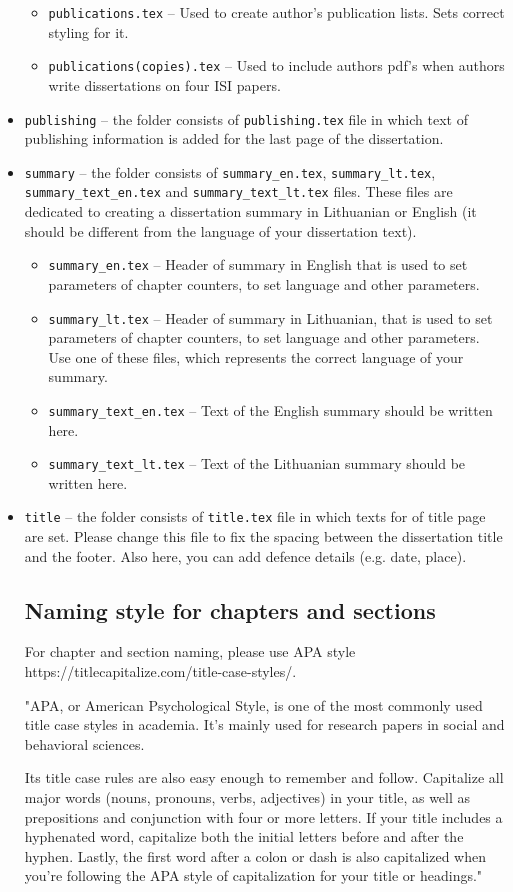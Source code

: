 \begin{itemize}
\begin{itemize}
            \item \verb|publications.tex| -- Used to create author's publication lists. Sets correct styling for it.
            \item \verb|publications(copies).tex| -- Used to include authors pdf's when authors write dissertations on four ISI papers.
        \end{itemize}
    \item \verb|publishing| -- the folder consists of \verb|publishing.tex| file in which text of publishing information is added for the last page of the dissertation.
    \item \verb|summary| -- the folder consists of \verb|summary_en.tex|, \verb|summary_lt.tex|, \verb|summary_text_en.tex| and \verb|summary_text_lt.tex| files. These files are dedicated to creating a dissertation summary in Lithuanian or English (it should be different from the language of your dissertation text).
        \begin{itemize}
            \item \verb|summary_en.tex| -- Header of summary in English that is used to set parameters of chapter counters, to set language and other parameters.
            \item \verb|summary_lt.tex| -- Header of summary in Lithuanian, that is used to set parameters of chapter counters, to set language and other parameters. Use one of these files, which represents the correct language of your summary.
            \item \verb|summary_text_en.tex| -- Text of the English summary should be written here.
            \item \verb|summary_text_lt.tex| -- Text of the Lithuanian summary should be written here.
        \end{itemize}    
    \item \verb|title| -- the folder consists of \verb|title.tex| file in which texts for of title page are set. Please change this file to fix the spacing between the dissertation title and the footer. Also here, you can add defence details (e.g. date, place).
    
\subsection{Naming style for chapters and sections}
For chapter and section naming, please use APA style https://titlecapitalize.com/title-case-styles/.

    "APA, or American Psychological Style, is one of the most commonly used title case styles in academia. It’s mainly used for research papers in social and behavioral sciences. 
        
    Its title case rules are also easy enough to remember and follow. Capitalize all major words (nouns, pronouns, verbs, adjectives) in your title, as well as prepositions and conjunction with four or more letters. If your title includes a hyphenated word, capitalize both the initial letters before and after the hyphen. Lastly, the first word after a colon or dash is also capitalized when you’re following the APA style of capitalization for your title or headings."
\end{itemize}

